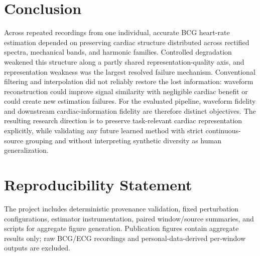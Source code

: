 \documentclass[10pt,twocolumn]{article}
\begin{document}
\section{Conclusion}
Across repeated recordings from one individual, accurate BCG heart-rate estimation depended on preserving cardiac structure distributed across rectified spectra, mechanical bands, and harmonic families. Controlled degradation weakened this structure along a partly shared representation-quality axis, and representation weakness was the largest resolved failure mechanism. Conventional filtering and interpolation did not reliably restore the lost information: waveform reconstruction could improve signal similarity with negligible cardiac benefit or could create new estimation failures. For the evaluated pipeline, waveform fidelity and downstream cardiac-information fidelity are therefore distinct objectives. The resulting research direction is to preserve task-relevant cardiac representation explicitly, while validating any future learned method with strict continuous-source grouping and without interpreting synthetic diversity as human generalization.

\section*{Reproducibility Statement}
The project includes deterministic provenance validation, fixed perturbation configurations, estimator instrumentation, paired window/source summaries, and scripts for aggregate figure generation. Publication figures contain aggregate results only; raw BCG/ECG recordings and personal-data-derived per-window outputs are excluded.



\end{document}
